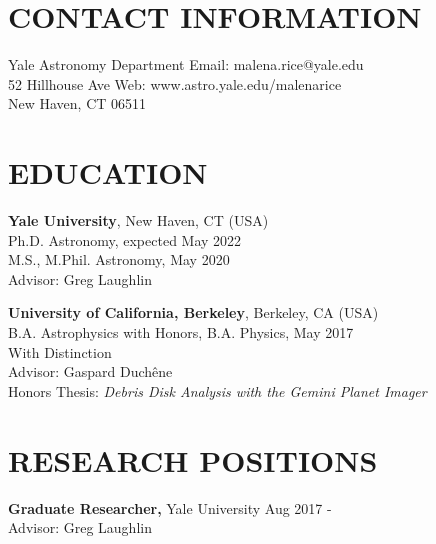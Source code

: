 \documentclass[margin]{res}
\begin{document}



\begin{resume}

\section{\normalfont CONTACT INFORMATION}
{Yale Astronomy Department \hfill Email: malena.rice@yale.edu\\
52 Hillhouse Ave \hfill Web: www.astro.yale.edu/malenarice\\
New Haven, CT 06511\\}

\vspace{-5mm}
\section{\normalfont EDUCATION}
\textbf{Yale University}, New Haven, CT (USA)\\
Ph.D. Astronomy, expected May 2022\\
M.S., M.Phil. Astronomy, May 2020\\
Advisor: Greg Laughlin

\textbf{University of California, Berkeley}, Berkeley, CA (USA) \\
B.A.  Astrophysics with Honors, B.A. Physics, May 2017\\
 With Distinction \\
 Advisor: Gaspard Duch\^{e}ne \\ Honors Thesis: \textit{Debris Disk Analysis with the Gemini Planet Imager}

\section{\normalfont RESEARCH POSITIONS}
\textbf{Graduate Researcher,} Yale University \hfill Aug 2017 - \\
\hspace{5mm} Advisor: Greg Laughlin


\end{resume}
\end{document}
